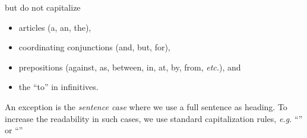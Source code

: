 \documentclass[11pt,a4paper]{article}
\begin{document}
\begin{itemize}
\vspace{-0.25cm}
but do not capitalize

\vspace{-0.25cm}
\begin{itemize}
\item articles (a, an, the),
\item coordinating conjunctions (and, but, for),
\item prepositions (against, as, between, in, at, by, from, \emph{etc.}), and
\item the “to” in infinitives.
\end{itemize}

An exception is the \emph{sentence case} where we use a full sentence as heading. To increase the readability in such cases, we use standard capitalization rules, \emph{e.g.} ``'' or ``''
\end{itemize}
\end{document}
